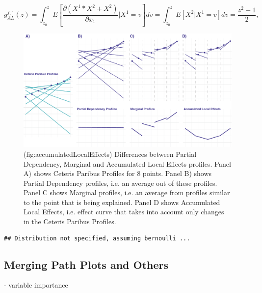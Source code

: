 \documentclass[12pt,]{krantz}
\theoremstyle{definition}
\theoremstyle{definition}
\theoremstyle{definition}
\theoremstyle{remark}
\begin{document}
\[
g_{AL}^{f,1}(z) = \int_{z_0}^z E\left[\frac{\partial (X^1*X^2 + X^2)}{\partial x_1}|X^1 = v\right] dv  = \int_{z_0}^z E\left[X^2|X^1 = v\right] dv  = \frac{z^2 -1 }{2},
\]

\begin{figure}

{\centering \includegraphics[width=0.9\linewidth]{figure/CP_ALL} 

}

\caption{(fig:accumulatedLocalEffects) Differences between Partial Dependency, Marginal and Accumulated Local Effects profiles. Panel A) shows Ceteris Paribus Profiles for 8 points. Panel B) shows Partial Dependency profiles, i.e. an average out of these profiles. Panel C shows Marginal profiles, i.e. an average from profiles similar to the point that is being explained. Panel D shows Accumulated Local Effects, i.e. effect curve that takes into account only changes in the Ceteris Paribus Profiles.}\label{fig:accumulatedLocalEffects}
\end{figure}

\begin{verbatim}
## Distribution not specified, assuming bernoulli ...
\end{verbatim}

\hypertarget{factorMerger}{%
\subsection{Merging Path Plots and Others}\label{factorMerger}}

\citep{demsar2018}

\citep{RJ2017016} \citep{MAGIX}

\citep{R-factorMerger}

\citep{Strobl2007} \citep{Strobl2008} - variable importance

\citep{2018arXiv180101489F}
\end{document}
